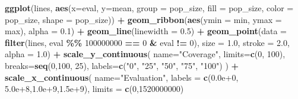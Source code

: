 \documentclass[
]{book}
\newenvironment{Shaded}{\begin{snugshade}}{\end{snugshade}}
\newcommand{\AttributeTok}[1]{\textcolor[rgb]{0.13,0.29,0.53}{#1}}
\newcommand{\DecValTok}[1]{\textcolor[rgb]{0.00,0.00,0.81}{#1}}
\newcommand{\FloatTok}[1]{\textcolor[rgb]{0.00,0.00,0.81}{#1}}
\newcommand{\FunctionTok}[1]{\textcolor[rgb]{0.13,0.29,0.53}{\textbf{#1}}}
\newcommand{\NormalTok}[1]{#1}
\newcommand{\SpecialCharTok}[1]{\textcolor[rgb]{0.81,0.36,0.00}{\textbf{#1}}}
\newcommand{\StringTok}[1]{\textcolor[rgb]{0.31,0.60,0.02}{#1}}
\begin{document}
\begin{Shaded}
\begin{Highlighting}[]
\FunctionTok{ggplot}\NormalTok{(lines, }\FunctionTok{aes}\NormalTok{(}\AttributeTok{x=}\NormalTok{eval, }\AttributeTok{y=}\NormalTok{mean, }\AttributeTok{group =}\NormalTok{ pop\_size, }\AttributeTok{fill =}\NormalTok{ pop\_size, }\AttributeTok{color =}\NormalTok{ pop\_size, }\AttributeTok{shape =}\NormalTok{ pop\_size)) }\SpecialCharTok{+}
  \FunctionTok{geom\_ribbon}\NormalTok{(}\FunctionTok{aes}\NormalTok{(}\AttributeTok{ymin =}\NormalTok{ min, }\AttributeTok{ymax =}\NormalTok{ max), }\AttributeTok{alpha =} \FloatTok{0.1}\NormalTok{) }\SpecialCharTok{+}
  \FunctionTok{geom\_line}\NormalTok{(}\AttributeTok{linewidth =} \FloatTok{0.5}\NormalTok{) }\SpecialCharTok{+}
  \FunctionTok{geom\_point}\NormalTok{(}\AttributeTok{data =} \FunctionTok{filter}\NormalTok{(lines, eval }\SpecialCharTok{\%\%} \DecValTok{100000000} \SpecialCharTok{==} \DecValTok{0} \SpecialCharTok{\&}\NormalTok{ eval }\SpecialCharTok{!=} \DecValTok{0}\NormalTok{), }\AttributeTok{size =} \FloatTok{1.0}\NormalTok{, }\AttributeTok{stroke =} \FloatTok{2.0}\NormalTok{, }\AttributeTok{alpha =} \FloatTok{1.0}\NormalTok{) }\SpecialCharTok{+}
  \FunctionTok{scale\_y\_continuous}\NormalTok{(}
    \AttributeTok{name=}\StringTok{"Coverage"}\NormalTok{,}
    \AttributeTok{limits=}\FunctionTok{c}\NormalTok{(}\DecValTok{0}\NormalTok{, }\DecValTok{100}\NormalTok{),}
    \AttributeTok{breaks=}\FunctionTok{seq}\NormalTok{(}\DecValTok{0}\NormalTok{,}\DecValTok{100}\NormalTok{, }\DecValTok{25}\NormalTok{),}
    \AttributeTok{labels=}\FunctionTok{c}\NormalTok{(}\StringTok{"0"}\NormalTok{, }\StringTok{"25"}\NormalTok{, }\StringTok{"50"}\NormalTok{, }\StringTok{"75"}\NormalTok{, }\StringTok{"100"}\NormalTok{)}
\NormalTok{  ) }\SpecialCharTok{+}
  \FunctionTok{scale\_x\_continuous}\NormalTok{(}
    \AttributeTok{name=}\StringTok{"Evaluation"}\NormalTok{,}
    \AttributeTok{labels =} \FunctionTok{c}\NormalTok{(}\StringTok{\textquotesingle{}0.0e+0\textquotesingle{}}\NormalTok{, }\StringTok{\textquotesingle{}5.0e+8\textquotesingle{}}\NormalTok{,}\StringTok{\textquotesingle{}1.0e+9\textquotesingle{}}\NormalTok{,}\StringTok{\textquotesingle{}1.5e+9\textquotesingle{}}\NormalTok{),}
    \AttributeTok{limits =} \FunctionTok{c}\NormalTok{(}\DecValTok{0}\NormalTok{,}\DecValTok{1520000000}\NormalTok{)}


\end{Highlighting}
\end{Shaded}
\end{document}
